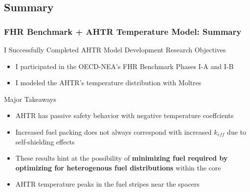 \subsection{Summary}
\begin{frame}
    \frametitle{FHR Benchmark + AHTR Temperature Model: Summary}
    \begin{block}{I Successfully Completed AHTR Model Development Research Objectives}
        \begin{itemize}
            \item I participated in the OECD-NEA's FHR Benchmark Phases I-A and I-B
            \item I modeled the \gls{AHTR}'s temperature distribution with Moltres
        \end{itemize}
    \end{block}
    \begin{block}{Major Takeaways}
        \begin{itemize}
            \item AHTR has passive safety behavior with negative temperature coeffcients
            \item Increased fuel packing does not always correspond with increased 
            $k_{eff}$ due to self-shielding effects 
            \item These results hint at the possibility of \textbf{minimizing fuel required by 
            optimizing for heterogenous fuel distributions} within the core
            \item AHTR temperature peaks in the fuel stripes near the spacers 
        \end{itemize}
    \end{block}
\end{frame}

